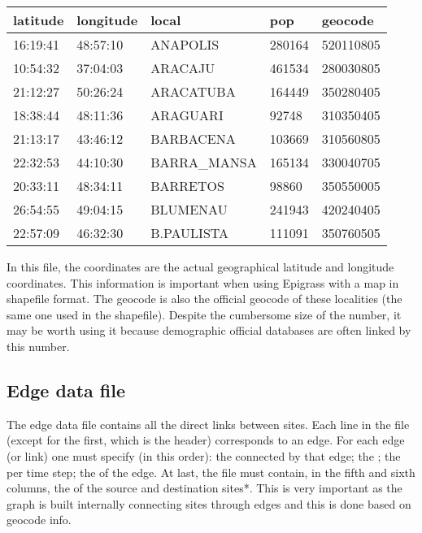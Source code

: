 \documentclass[letterpaper,10pt,english]{sphinxmanual}
\begin{document}
\begin{savenotes}\sphinxattablestart
\centering
\begin{tabulary}{\linewidth}[t]{|T|T|T|T|T|}
\hline
\sphinxstyletheadfamily 
latitude
&\sphinxstyletheadfamily 
longitude
&\sphinxstyletheadfamily 
local
&\sphinxstyletheadfamily 
pop
&\sphinxstyletheadfamily 
geocode
\\
\hline
\sphinxhyphen{}16:19:41
&
\sphinxhyphen{}48:57:10
&
ANAPOLIS
&
280164
&
520110805
\\
\hline
\sphinxhyphen{}10:54:32
&
\sphinxhyphen{}37:04:03
&
ARACAJU
&
461534
&
280030805
\\
\hline
\sphinxhyphen{}21:12:27
&
\sphinxhyphen{}50:26:24
&
ARACATUBA
&
164449
&
350280405
\\
\hline
\sphinxhyphen{}18:38:44
&
\sphinxhyphen{}48:11:36
&
ARAGUARI
&
92748
&
310350405
\\
\hline
\sphinxhyphen{}21:13:17
&
\sphinxhyphen{}43:46:12
&
BARBACENA
&
103669
&
310560805
\\
\hline
\sphinxhyphen{}22:32:53
&
\sphinxhyphen{}44:10:30
&
BARRA\_MANSA
&
165134
&
330040705
\\
\hline
\sphinxhyphen{}20:33:11
&
\sphinxhyphen{}48:34:11
&
BARRETOS
&
98860
&
350550005
\\
\hline
\sphinxhyphen{}26:54:55
&
\sphinxhyphen{}49:04:15
&
BLUMENAU
&
241943
&
420240405
\\
\hline
\sphinxhyphen{}22:57:09
&
\sphinxhyphen{}46:32:30
&
B.PAULISTA
&
111091
&
350760505
\\
\hline
\end{tabulary}
\par
\sphinxattableend\end{savenotes}

In this file, the coordinates are the actual geographical latitude and longitude coordinates. This information is important when using Epigrass with a map in shapefile format. The geocode is also the official geocode of these localities (the same one used in the shapefile). Despite the cumbersome size of the number, it may be worth using it because demographic official databases are often linked by this number.


\subsection{Edge data file}
\label{\detokenize{using:edge-data-file}}
The edge data file contains all the direct links between sites. Each line in the file (except for the first, which is the header) corresponds to an edge. For each edge (or link) one must specify (in this order): the  connected by that edge; the ; the  per time step; the  of the edge. At last, the file must contain, in the fifth and sixth columns, the  of the source and destination sites*. This is very important as the graph is built internally connecting sites through edges and this is done based on geocode info.
\end{document}
